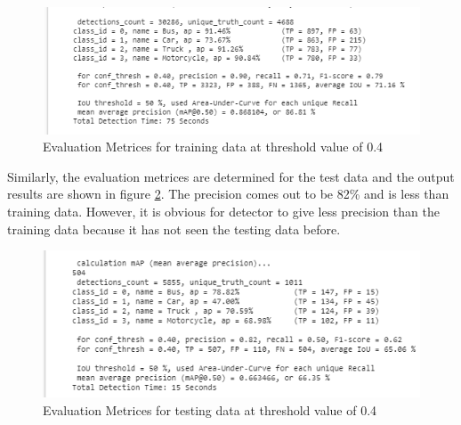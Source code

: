 \begin{figure}[H]
\centering
\captionsetup{justification = centering}
\includegraphics[scale= 0.8]{CHAPTERS/Chapter-5/images/5.10.PNG}
\caption{Evaluation Metrices for training data at threshold value of 0.4}
\label{fig:5.10}
\end{figure}
Similarly, the evaluation metrices are determined for the test data and the output results are shown in figure \ref{fig:5.11}. The precision comes out to be 82\% and is less than training data. However, it is obvious for detector to give less precision than the training data because it has not seen the testing data before. 
\begin{figure}[H]
\centering
\captionsetup{justification = centering}
\includegraphics[scale= 0.8]{CHAPTERS/Chapter-5/images/5.11.PNG}
\caption{Evaluation Metrices for testing data at threshold value of 0.4}
\label{fig:5.11}
\end{figure}

